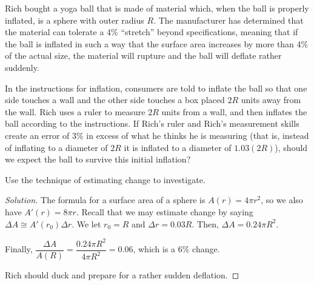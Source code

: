 \documentclass{agony}
\begin{document}
\question Rich bought a yoga ball that is made of material which,
when the ball is properly inflated, is a sphere with outer radius $R$.
The manufacturer has determined that the material can tolerate a 4\% ``stretch'' beyond specifications,
meaning that if the ball is inflated in such a way that the surface area increases by more than 4\%
of the actual size, the material will rupture and the ball will deflate rather suddenly.

In the instructions for inflation, consumers are told to inflate the ball
so that one side touches a wall and the other side touches a box placed $2R$ units away from the wall.
Rich uses a ruler to measure $2R$ units from a wall, and then inflates the ball according to the instructions.
If Rich's ruler and Rich's measurement skills create an error of 3\% in excess of what he thinks he is measuring
(that is, instead of inflating to a diameter of $2R$ it is inflated to a diameter of $1.03(2R)$),
should we expect the ball to survive this initial inflation?

Use the technique of estimating change to investigate.

\begin{proof}[Solution]
  The formula for a surface area of a sphere is $A(r)=4\pi r^2$, so we also have $A'(r)=8\pi r$.
  Recall that we may estimate change by saying $\Delta A \cong A'(r_0) \Delta r$.
  We let $r_0=R$ and $\Delta r = 0.03R$.
  Then, $\Delta A = 0.24\pi R^2$.

  Finally, $\dfrac{\Delta A}{A(R)} = \dfrac{0.24\pi R^2}{4\pi R^2} = 0.06$, which is a 6\% change.

  Rich should duck and prepare for a rather sudden deflation.
\end{proof}
\end{document}
